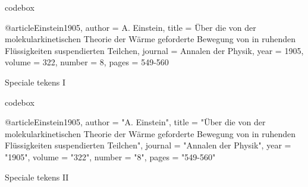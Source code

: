 
\begin{saveblock}{codebox}%
	\begin{highlightblock}
		@article{Einstein1905,
			author = {A. Einstein},
			title = {\"Uber die von der
				molekularkinetischen Theorie der W\"arme
				geforderte Bewegung von in ruhenden
				Fl\"ussigkeiten suspendierten Teilchen},
			journal = {Annalen der Physik},
			year = 1905,
			volume = 322,
			number = 8,
			pages = {549-560}
		}
	\end{highlightblock}
\end{saveblock}

\begin{frame}{Speciale tekens I}
	
	\medskip
	
\end{frame}

\begin{saveblock}{codebox}%
	\begin{highlightblock}
		@article{Einstein1905,
			author = "A. Einstein",
			title = "{\"U}ber die von der
				molekularkinetischen Theorie der W{\"a}rme
				geforderte Bewegung von in ruhenden
				Fl{\"u}ssigkeiten suspendierten Teilchen",
			journal = "Annalen der Physik",
			year = "1905",
			volume = "322",
			number = "8",
			pages = "549-560"
		}
	\end{highlightblock}
\end{saveblock}


\begin{frame}{Speciale tekens II}
	
	\medskip
	
\end{frame}
